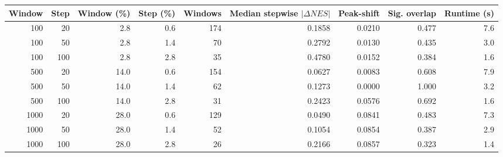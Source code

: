 \begin{tabular}{rrrrrrrrr}
\toprule
Window & Step & Window (\%) & Step (\%) & Windows & Median stepwise $|\Delta NES|$ & Peak-shift & Sig. overlap & Runtime (s) \\
\midrule
100 & 20 & 2.8 & 0.6 & 174 & 0.1858 & 0.0210 & 0.477 & 7.6 \\
100 & 50 & 2.8 & 1.4 & 70 & 0.2792 & 0.0130 & 0.435 & 3.0 \\
100 & 100 & 2.8 & 2.8 & 35 & 0.4780 & 0.0152 & 0.384 & 1.6 \\
500 & 20 & 14.0 & 0.6 & 154 & 0.0627 & 0.0083 & 0.608 & 7.9 \\
500 & 50 & 14.0 & 1.4 & 62 & 0.1273 & 0.0000 & 1.000 & 3.2 \\
500 & 100 & 14.0 & 2.8 & 31 & 0.2423 & 0.0576 & 0.692 & 1.6 \\
1000 & 20 & 28.0 & 0.6 & 129 & 0.0490 & 0.0841 & 0.483 & 7.3 \\
1000 & 50 & 28.0 & 1.4 & 52 & 0.1054 & 0.0854 & 0.387 & 2.9 \\
1000 & 100 & 28.0 & 2.8 & 26 & 0.2166 & 0.0857 & 0.323 & 1.4 \\
\bottomrule
\end{tabular}
